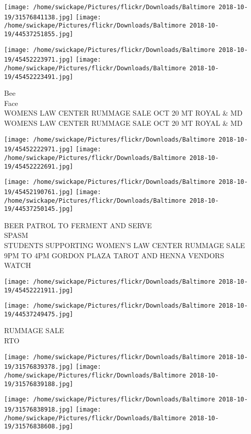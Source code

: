 \documentclass[10pt,letterpaper]{article}
\begin{document}
\texttt{[image: /home/swickape/Pictures/flickr/Downloads/Baltimore 2018-10-19/31576841138.jpg]}
\texttt{[image: /home/swickape/Pictures/flickr/Downloads/Baltimore 2018-10-19/44537251855.jpg]}

\texttt{[image: /home/swickape/Pictures/flickr/Downloads/Baltimore 2018-10-19/45452223971.jpg]}
\texttt{[image: /home/swickape/Pictures/flickr/Downloads/Baltimore 2018-10-19/45452223491.jpg]}

Bee\\
Face\\
WOMENS LAW CENTER RUMMAGE SALE OCT 20 MT ROYAL \& MD\\
WOMENS LAW CENTER RUMMAGE SALE OCT 20 MT ROYAL \& MD\\
\pagebreak

\texttt{[image: /home/swickape/Pictures/flickr/Downloads/Baltimore 2018-10-19/45452222971.jpg]}
\texttt{[image: /home/swickape/Pictures/flickr/Downloads/Baltimore 2018-10-19/45452222691.jpg]}

\texttt{[image: /home/swickape/Pictures/flickr/Downloads/Baltimore 2018-10-19/45452190761.jpg]}
\texttt{[image: /home/swickape/Pictures/flickr/Downloads/Baltimore 2018-10-19/44537250145.jpg]}

BEER PATROL TO FERMENT AND SERVE\\
SPASM\\
STUDENTS SUPPORTING WOMEN'S LAW CENTER RUMMAGE SALE 9PM TO 4PM GORDON PLAZA TAROT AND HENNA VENDORS\\
WATCH\\
\pagebreak

\texttt{[image: /home/swickape/Pictures/flickr/Downloads/Baltimore 2018-10-19/45452221911.jpg]}

\vspace{0.25in}
\texttt{[image: /home/swickape/Pictures/flickr/Downloads/Baltimore 2018-10-19/44537249475.jpg]}

RUMMAGE SALE\\
RTO\\
\pagebreak

\texttt{[image: /home/swickape/Pictures/flickr/Downloads/Baltimore 2018-10-19/31576839378.jpg]}
\texttt{[image: /home/swickape/Pictures/flickr/Downloads/Baltimore 2018-10-19/31576839188.jpg]}

\texttt{[image: /home/swickape/Pictures/flickr/Downloads/Baltimore 2018-10-19/31576838918.jpg]}
\texttt{[image: /home/swickape/Pictures/flickr/Downloads/Baltimore 2018-10-19/31576838608.jpg]}
\end{document}
